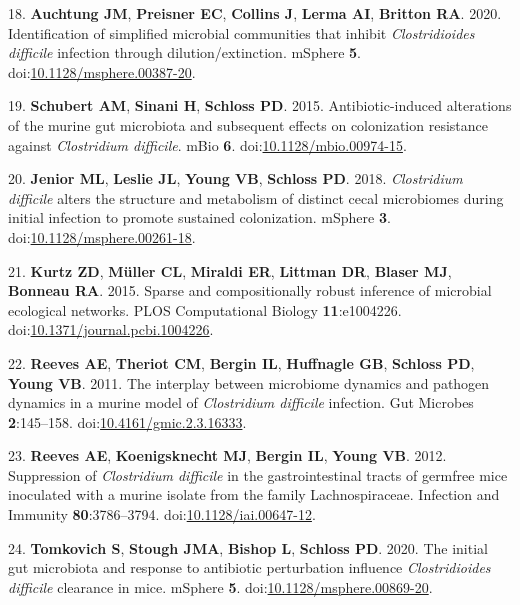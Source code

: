 \documentclass[11pt,]{article}
\newlength{\cslhangindent}
\newenvironment{cslreferences}%
  {\setlength{\parindent}{0pt}%
  \everypar{\setlength{\hangindent}{\cslhangindent}}\ignorespaces}%
  {\par}
\begin{document}
\begin{cslreferences}
\leavevmode\hypertarget{ref-auchtung2020}{}%
18. \textbf{Auchtung JM}, \textbf{Preisner EC}, \textbf{Collins J},
\textbf{Lerma AI}, \textbf{Britton RA}. 2020. Identification of
simplified microbial communities that inhibit \emph{Clostridioides
difficile} infection through dilution/extinction. mSphere \textbf{5}.
doi:\href{https://doi.org/10.1128/msphere.00387-20}{10.1128/msphere.00387-20}.

\leavevmode\hypertarget{ref-schubert2015}{}%
19. \textbf{Schubert AM}, \textbf{Sinani H}, \textbf{Schloss PD}. 2015.
Antibiotic-induced alterations of the murine gut microbiota and
subsequent effects on colonization resistance against \emph{Clostridium
difficile}. mBio \textbf{6}.
doi:\href{https://doi.org/10.1128/mbio.00974-15}{10.1128/mbio.00974-15}.

\leavevmode\hypertarget{ref-jenior2018}{}%
20. \textbf{Jenior ML}, \textbf{Leslie JL}, \textbf{Young VB},
\textbf{Schloss PD}. 2018. \emph{Clostridium difficile} alters the
structure and metabolism of distinct cecal microbiomes during initial
infection to promote sustained colonization. mSphere \textbf{3}.
doi:\href{https://doi.org/10.1128/msphere.00261-18}{10.1128/msphere.00261-18}.

\leavevmode\hypertarget{ref-kurtz2015}{}%
21. \textbf{Kurtz ZD}, \textbf{Müller CL}, \textbf{Miraldi ER},
\textbf{Littman DR}, \textbf{Blaser MJ}, \textbf{Bonneau RA}. 2015.
Sparse and compositionally robust inference of microbial ecological
networks. PLOS Computational Biology \textbf{11}:e1004226.
doi:\href{https://doi.org/10.1371/journal.pcbi.1004226}{10.1371/journal.pcbi.1004226}.

\leavevmode\hypertarget{ref-reeves2011}{}%
22. \textbf{Reeves AE}, \textbf{Theriot CM}, \textbf{Bergin IL},
\textbf{Huffnagle GB}, \textbf{Schloss PD}, \textbf{Young VB}. 2011. The
interplay between microbiome dynamics and pathogen dynamics in a murine
model of \emph{Clostridium difficile} infection. Gut Microbes
\textbf{2}:145--158.
doi:\href{https://doi.org/10.4161/gmic.2.3.16333}{10.4161/gmic.2.3.16333}.

\leavevmode\hypertarget{ref-reeves2012}{}%
23. \textbf{Reeves AE}, \textbf{Koenigsknecht MJ}, \textbf{Bergin IL},
\textbf{Young VB}. 2012. Suppression of \emph{Clostridium difficile} in
the gastrointestinal tracts of germfree mice inoculated with a murine
isolate from the family Lachnospiraceae. Infection and Immunity
\textbf{80}:3786--3794.
doi:\href{https://doi.org/10.1128/iai.00647-12}{10.1128/iai.00647-12}.

\leavevmode\hypertarget{ref-tomkovich2020}{}%
24. \textbf{Tomkovich S}, \textbf{Stough JMA}, \textbf{Bishop L},
\textbf{Schloss PD}. 2020. The initial gut microbiota and response to
antibiotic perturbation influence \emph{Clostridioides difficile}
clearance in mice. mSphere \textbf{5}.
doi:\href{https://doi.org/10.1128/msphere.00869-20}{10.1128/msphere.00869-20}.


\end{cslreferences}
\end{document}
